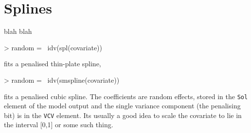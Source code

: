 \documentclass{article}
\begin{document}
\section{Splines}

blah blah

\begin{Schunk}
\begin{Sinput}
> random = ~idv(spl(covariate))
\end{Sinput}
\end{Schunk}

fits a penalised thin-plate spline,

\begin{Schunk}
\begin{Sinput}
> random = ~idv(smspline(covariate))
\end{Sinput}
\end{Schunk}

fits a penalised cubic spline. The coefficients are random effects, stored in the \texttt{Sol} element of the model output and the single variance component (the penalising bit) is in the \texttt{VCV} element. Its usually a good idea to scale the covariate to lie in the interval [0,1] or some such thing. 


\ifalone
\end{document}
